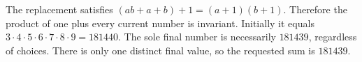The replacement satisfies $(ab+a+b)+1=(a+1)(b+1)$. Therefore the product of one plus every current number is invariant. Initially it equals $3\cdot4\cdot5\cdot6\cdot7\cdot8\cdot9=181440$. The sole final number is necessarily $181439$, regardless of choices. There is only one distinct final value, so the requested sum is $\boxed{181439}$.

